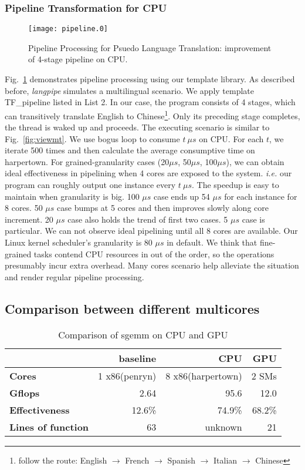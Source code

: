 \subsubsection{Pipeline Transformation for CPU}
\begin{figure}[htp]
\texttt{[image: pipeline.0]}
\caption{Pipeline Processing for Psuedo Language Translation:
  improvement of 4-stage pipeline on CPU.}\label{fig:pipe}
\end{figure}

Fig.~\ref{fig:pipe} demonstrates pipeline processing using our
template library. As described before, \textit{langpipe} simulates a
multilingual scenario. We apply template TF\_pipeline listed in
List 2. In our case, the program consists of 4 stages,
which can transitively translate English to Chinese\footnote{follow the 
  route: English  $\to$ French $\to$ Spanish $\to$ Italian $\to$
  Chinese}. Only its preceding stage completes,  the thread is waked
up and proceeds. The executing scenario is similar to Fig.~\ref{fig:viewmt}. We use bogus loop to consume $t \  \mu s$ on CPU. For each $t$, we iterate 500
times and then calculate the average consumptive time on harpertown. For
grained-granularity cases (20$\mu s$, 50$\mu s$, 100$\mu s$), we can obtain ideal
effectiveness in pipelining when 4 cores are exposed to the system.
\textit{i.e.} our program can roughly output one instance every $t\  \mu
s$. The speedup is easy to maintain when granularity is big. 100 $\mu s$ case ends up 54 $\mu s$ for each instance for 8 cores. 50  $\mu s$ case
bumps at 5 cores and then improves slowly along core increment. 20
$\mu s$ case also holds the trend of first two cases. 5 $\mu s$ case is
particular. We can not observe ideal pipelining until all 8
cores are available.  Our Linux kernel scheduler's granularity is 80
$\mu s$ in default. We think that fine-grained tasks contend
CPU resources in out of the order, so the operations presumably
incur extra overhead. Many cores scenario help alleviate the
situation and render regular pipeline processing.

\subsection{Comparison between different multicores}\label{exp:3}
\begin{table}[hbt]
\caption{Comparison of sgemm on CPU and GPU}\label{tbl:sgemm}
\begin{tabular}{|l|r|r|r|}
\hline
& baseline& CPU & GPU\\
\hline
\textbf{Cores} &1 x86(penryn)& 8 x86(harpertown)& 2 SMs\\
\hline
\textbf{Gflops}& 2.64 &95.6&  12.0\\
\hline
\textbf{Effectiveness}&12.6\%& 74.9\%&68.2\%\\
\hline
\textbf{Lines of function}&63&unknown&21\\
\hline
\end{tabular}
\end{table}

